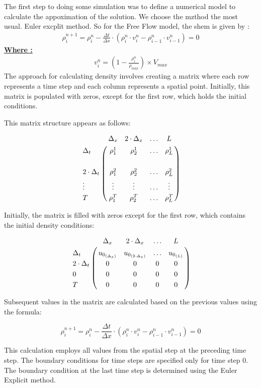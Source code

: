 \documentclass{article}
\begin{document}
		
		
		The first step to doing some simulation was to define a numerical model to calculate the appoximation of the solution.
		We choose the mzthod the most usual. Euler excplit method.
		So for the Free Flow model, the shem is given by : 
		\begin{align*}
			\boxed{\rho_{i}^{n+1} = \rho_i^n - \frac{\Delta t}{\Delta x} \cdot \left(\rho_i^n \cdot v_i^n - \rho_{i-1}^n \cdot v_{i-1}^n \right)
				=0}
		\end{align*}
		\textbf{\underline{Where : }}
		\begin{align*}
			\boxed{v_i^n = \left( 1 - \frac{\rho_i^n}{\rho_{max}}\right)  \times V_{max}}
		\end{align*}
		\newpage
		The approach for calculating density involves creating a matrix where each row represents a time step and each column represents a spatial point. Initially, this matrix is populated with zeros, except for the first row, which holds the initial conditions.
		
		This matrix structure appears as follows:
		
		\begin{align*}
			\bordermatrix { 
				& \Delta_x & 2\cdot \Delta_x & \hdots & L \cr 
				\Delta_t & \rho_1^1 & \rho_2^1 & \hdots & \rho_L^1 \cr \cr
				2\cdot \Delta_t & \rho_1^2 & \rho_2^2 & \hdots & \rho_L^2\cr
				\vdots & \vdots & \vdots & \hdots & \vdots \cr
				T & \rho_1^T & \rho_2^T & \hdots & \rho_L^T}
		\end{align*}
		

		Initially, the matrix is filled with zeros except for the first row, which contains the initial density conditions:

		\begin{align*}
			\bordermatrix { 
				& \Delta_x & 2\cdot \Delta_x & \hdots & L \cr 
				\Delta_t & u_{0_{(\Delta_x)}} & u_{0_{(2 \cdot \Delta_x)}} & \hdots & u_{0_{(L)}} \cr 
				2\cdot \Delta_t & 0 & 0 & 0 & 0\cr
				0 & 0 & 0 & 0 & 0 \cr
				T & 0 & 0 & 0 & 0}
		\end{align*}

		 
	
		Subsequent values in the matrix are calculated based on the previous values using the formula:
		
		\[
		\rho_{i}^{n+1} = \rho_i^n - \frac{\Delta t}{\Delta x} \cdot \left(\rho_i^n \cdot v_i^n - \rho_{i-1}^n \cdot v_{i-1}^n \right) = 0
		\]
		
		This calculation employs all values from the spatial step at the preceding time step. The boundary conditions for time steps are specified only for time step 0. The boundary condition at the last time step is determined using the Euler Explicit method.
		
\end{document}
